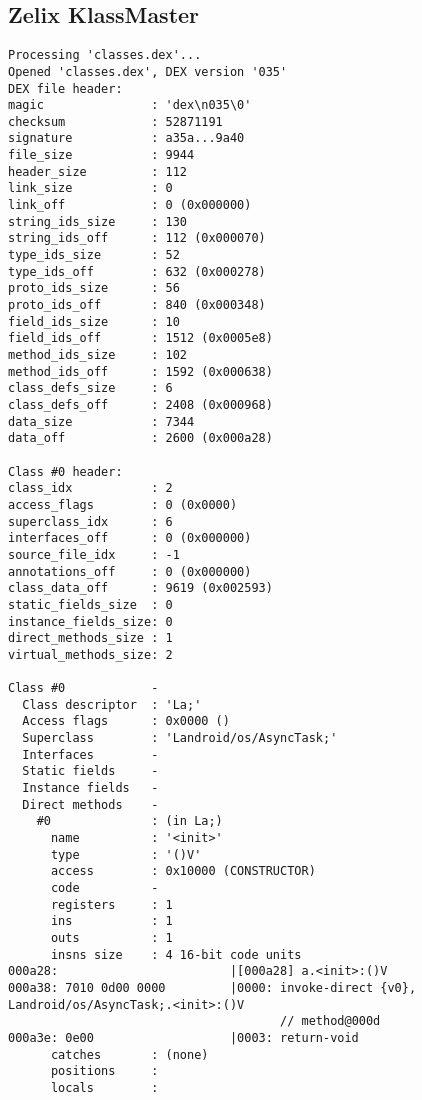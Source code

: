 \subsection{Zelix KlassMaster}
\label{app:dzkm}
\begin{lstlisting}
Processing 'classes.dex'...
Opened 'classes.dex', DEX version '035'
DEX file header:
magic               : 'dex\n035\0'
checksum            : 52871191
signature           : a35a...9a40
file_size           : 9944
header_size         : 112
link_size           : 0
link_off            : 0 (0x000000)
string_ids_size     : 130
string_ids_off      : 112 (0x000070)
type_ids_size       : 52
type_ids_off        : 632 (0x000278)
proto_ids_size      : 56
proto_ids_off       : 840 (0x000348)
field_ids_size      : 10
field_ids_off       : 1512 (0x0005e8)
method_ids_size     : 102
method_ids_off      : 1592 (0x000638)
class_defs_size     : 6
class_defs_off      : 2408 (0x000968)
data_size           : 7344
data_off            : 2600 (0x000a28)

Class #0 header:
class_idx           : 2
access_flags        : 0 (0x0000)
superclass_idx      : 6
interfaces_off      : 0 (0x000000)
source_file_idx     : -1
annotations_off     : 0 (0x000000)
class_data_off      : 9619 (0x002593)
static_fields_size  : 0
instance_fields_size: 0
direct_methods_size : 1
virtual_methods_size: 2

Class #0            -
  Class descriptor  : 'La;'
  Access flags      : 0x0000 ()
  Superclass        : 'Landroid/os/AsyncTask;'
  Interfaces        -
  Static fields     -
  Instance fields   -
  Direct methods    -
    #0              : (in La;)
      name          : '<init>'
      type          : '()V'
      access        : 0x10000 (CONSTRUCTOR)
      code          -
      registers     : 1
      ins           : 1
      outs          : 1
      insns size    : 4 16-bit code units
000a28:                        |[000a28] a.<init>:()V
000a38: 7010 0d00 0000         |0000: invoke-direct {v0}, Landroid/os/AsyncTask;.<init>:()V
                                      // method@000d
000a3e: 0e00                   |0003: return-void
      catches       : (none)
      positions     :
      locals        :


\end{lstlisting}
